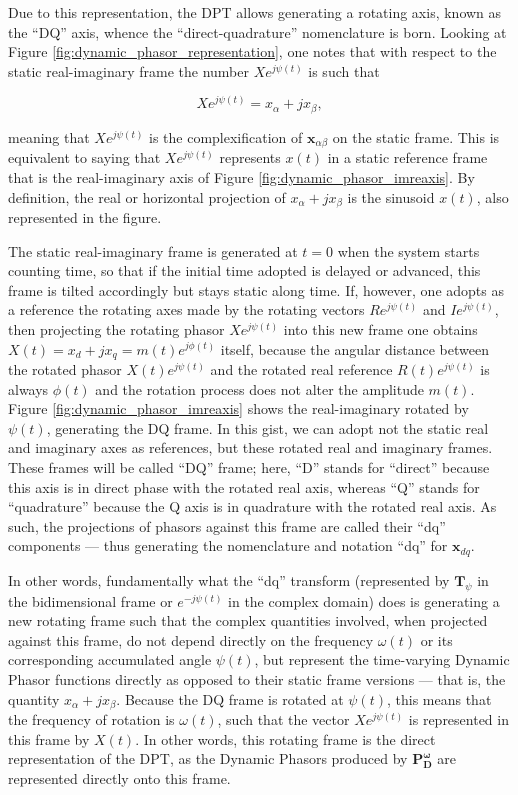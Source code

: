 	Due to this representation, the DPT allows generating a rotating axis, known as the ``DQ'' axis, whence the ``direct-quadrature'' nomenclature is born. Looking at Figure \ref{fig:dynamic_phasor_representation}, one notes that with respect to the static real-imaginary frame the number $Xe^{j\psi(t)}$ is such that

\begin{equation} Xe^{j\psi(t)} = x_\alpha + jx_\beta,\end{equation}

	\noindent meaning that $Xe^{j\psi(t)}$ is the complexification of $\mathbf{x}_{\alpha\beta}$ on the static frame. This is equivalent to saying that $Xe^{j\psi(t)}$ represents $x(t)$ in a static reference frame that is the real-imaginary axis of Figure \ref{fig:dynamic_phasor_imreaxis}. By definition, the real or horizontal projection of $x_\alpha + j x_\beta$ is the sinusoid $x(t)$, also represented in the figure.

	The static real-imaginary frame is generated at $t=0$ when the system starts counting time, so that if the initial time adopted is delayed or advanced, this frame is tilted accordingly but stays static along time. If, however, one adopts as a reference the rotating axes made by the rotating vectors $Re^{j\psi(t)}$ and $Ie^{j\psi(t)}$, then projecting the rotating phasor $Xe^{j\psi(t)}$ into this new frame one obtains $X(t) = x_d + jx_q = m(t)e^{j\phi(t)}$ itself, because the angular distance between the rotated phasor $X(t)e^{j\psi(t)}$ and the rotated real reference $R(t)e^{j\psi(t)}$ is always $\phi(t)$ and the rotation process does not alter the amplitude $m(t)$. Figure \ref{fig:dynamic_phasor_imreaxis} shows the real-imaginary rotated by $\psi(t)$, generating the DQ frame. In this gist, we can adopt not the static real and imaginary axes as references, but these rotated real and imaginary frames. These frames will be called ``DQ'' frame; here, ``D'' stands for ``direct'' because this axis is in direct phase with the rotated real axis, whereas ``Q'' stands for ``quadrature'' because the Q axis is in quadrature with the rotated real axis. As such, the projections of phasors against this frame are called their ``dq'' components — thus generating the nomenclature and notation ``dq'' for $\mathbf{x}_{dq}$.

	In other words, fundamentally what the ``dq'' transform (represented by $\mathbf{T}_{\psi}$ in the bidimensional frame or $e^{-j\psi(t)}$ in the complex domain) does is generating a new rotating frame such that the complex quantities involved, when projected against this frame, do not depend directly on the frequency $\omega(t)$ or its corresponding accumulated angle $\psi(t)$, but represent the time-varying Dynamic Phasor functions directly as opposed to their static frame versions — that is, the quantity $x_\alpha + jx_\beta$. Because the DQ frame is rotated at $\psi(t)$, this means that the frequency of rotation is $\omega(t)$, such that the vector $Xe^{j\psi(t)}$ is represented in this frame by $X(t)$. In other words, this rotating frame is the direct representation of the DPT, as the Dynamic Phasors produced by $\mathbf{P_D^{\omega}}$ are represented directly onto this frame.

